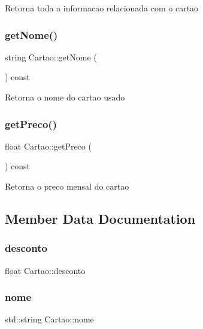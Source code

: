 Retorna toda a informacao relacionada com o cartao \mbox{\label{class_cartao_a60d369c3f5a4fe21aff1661ee7d90345}} 
\subsubsection{\texorpdfstring{get\+Nome()}{getNome()}}
{\footnotesize\ttfamily string Cartao\+::get\+Nome (\begin{DoxyParamCaption}{ }\end{DoxyParamCaption}) const}

Retorna o nome do cartao usado \mbox{\label{class_cartao_a3b2aebc6843c561c862f2efe7ff02115}} 
\subsubsection{\texorpdfstring{get\+Preco()}{getPreco()}}
{\footnotesize\ttfamily float Cartao\+::get\+Preco (\begin{DoxyParamCaption}{ }\end{DoxyParamCaption}) const}

Retorna o preco mensal do cartao 

\subsection{Member Data Documentation}
\mbox{\label{class_cartao_a9abef37fa118bed1459d3c273c79a76a}} 
\subsubsection{\texorpdfstring{desconto}{desconto}}
{\footnotesize\ttfamily float Cartao\+::desconto\hspace{0.3cm}{\ttfamily [private]}}

\mbox{\label{class_cartao_a831b64c396e3903ff85c8165640eb41a}} 
\subsubsection{\texorpdfstring{nome}{nome}}
{\footnotesize\ttfamily std\+::string Cartao\+::nome\hspace{0.3cm}{\ttfamily [private]}}

